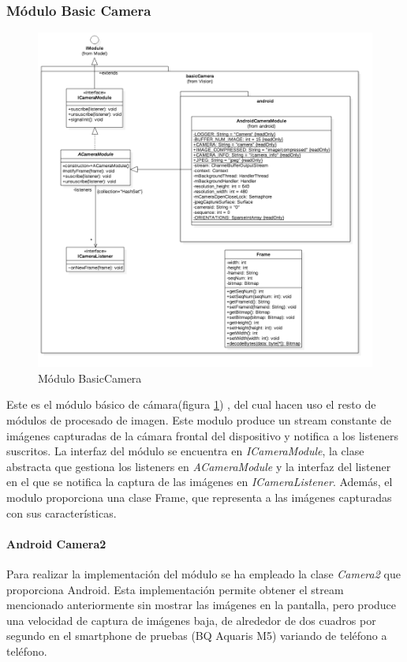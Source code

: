 \subsubsection{Módulo Basic Camera}
\begin{figure}
	\centering
	\includegraphics[width=1\linewidth]{imagenes/diagramas/BasicCameraModule.png}
	\caption{Módulo BasicCamera}
	\label{fig:basic-camera-module}
\end{figure}
Este es el módulo básico de cámara(figura \ref{fig:basic-camera-module}) , del cual hacen uso el resto de módulos de procesado de imagen. Este modulo produce un stream constante de imágenes capturadas de la cámara frontal del dispositivo y notifica a los listeners suscritos.
La interfaz del módulo se encuentra en \textit{ICameraModule}, la clase abstracta que gestiona los listeners en \textit{ACameraModule} y la interfaz del listener en el que se notifica la captura de las imágenes en \textit{ICameraListener}. Además, el modulo proporciona una clase Frame, que representa a las imágenes capturadas con sus características.

\paragraph*{Android Camera2\\}
Para realizar la implementación del módulo se ha empleado la clase \textit{Camera2} que proporciona Android. Esta implementación permite obtener el stream mencionado anteriormente sin mostrar las imágenes en la pantalla, pero produce una velocidad de captura de imágenes baja, de alrededor de dos cuadros por segundo en el smartphone de pruebas (BQ Aquaris M5) variando de teléfono a teléfono.

